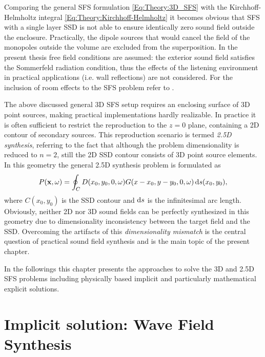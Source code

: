 Comparing the general SFS formulation \eqref{Eq:Theory:3D_SFS} with the Kirchhoff-Helmholtz integral \eqref{Eq:Theory:Kirchhoff-Helmholtz} it becomes obvious that SFS with a single layer SSD is not able to ensure identically zero sound field outside the enclosure.
Practically, the dipole sources that would cancel the field of the monopoles outside the volume are excluded from the superposition.
In the present thesis free field conditions are assumed: the exterior sound field satisfies the Sommerfeld radiation condition, thus the effects of the listening environment in practical applications (i.e. wall reflections) are not considered. 
For the inclusion of room effects to the SFS problem refer to \cite{Spors2005, app8010016}.

\vspace{3mm}
The above discussed general 3D SFS setup requires an enclosing surface of 3D point sources, making practical implementations hardly realizable.
In practice it is often sufficient to restrict the reproduction to the $z=0$ plane, containing a 2D contour of secondary sources.
This reproduction scenario is termed \emph{2.5D synthesis}, referring to the fact that although the problem dimensionality is reduced to $n=2$, still the 2D SSD contour consists of 3D point source elements.
In this geometry the general 2.5D synthesis problem is formulated as
\begin{equation}
P(\mathbf{x},\omega) = \oint_{C} D(x_0,y_0,0,\omega) G(x - x_0, y-y_0, 0 , \omega ) \, \mathrm{d} s( x_0, y_0 ),
\label{Eq:Theory:25D_SFS}
\end{equation}
where $C(x_0,y_0)$ is the SSD contour and $\mathrm{d} s$ is the infinitesimal arc length.
Obviously, neither 2D nor 3D sound fields can be perfectly synthesized in this geometry due to dimensionality inconsistency between the target field and the SSD.
Overcoming the artifacts of this \emph{dimensionality mismatch} is the central question of practical sound field synthesis and is the main topic of the present chapter.

In the followings this chapter presents the approaches to solve the 3D and 2.5D SFS problems including physically based implicit and particularly mathematical explicit solutions. 

\section{Implicit solution: Wave Field Synthesis}

